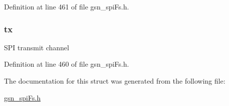 Definition at line 461 of file gsn\_\-spiFs.h.

\hypertarget{a00235_afa4a614da4ba8222e2bc91faf9e1d471}{
\subsubsection[{tx}]{ {\bf tx}}}
\label{a00235_afa4a614da4ba8222e2bc91faf9e1d471}
SPI transmit channel 

Definition at line 460 of file gsn\_\-spiFs.h.



The documentation for this struct was generated from the following file:\begin{DoxyCompactItemize}
\item 
\hyperlink{a00589}{gsn\_\-spiFs.h}\end{DoxyCompactItemize}
